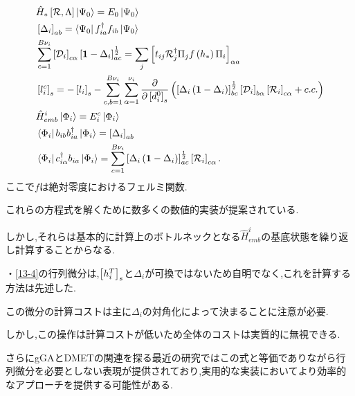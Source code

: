 \begin{align}
    &\hat{H}_{*}\left[ \mathcal{R},\Lambda \right]\Ket{\Psi_{0}}=E_{0}\Ket{\Psi_{0}} \label{13-1}\\
    &\left[ \Delta_{i} \right]_{ab}=\Bra{\Psi_{0}}f^\dagger_{ia}f_{ib}\Ket{\Psi_{0}} \label{13-2}\\
    &\sum_{c=1}^{B\nu_{i}}\left[ \mathcal{D}_{i} \right]_{c\alpha}\left[ \bm{1}-\Delta_{i} \right]^{\frac{1}{2}}_{ac}=\sum_{j}\left[ t_{ij}\mathcal{R}^\dagger_{j}\Pi_{j}f\left( h_{*} \right)\Pi_{i} \right]_{\alpha a}\label{13-3}\\
    &\left[ l^{c}_{i} \right]_{s}=-\left[ l_{i} \right]_{s}-\sum_{c,b=1}^{B\nu_{i}}\sum_{\alpha=1}^{\nu_{i}}\frac{\partial }{\partial \left[ d^{0}_{i} \right]_{s}}\left( \left[ \Delta_{i}\left( \bm{1}-\Delta_{i} \right) \right]^{\frac{1}{2}}_{bc}\left[ \mathcal{D}_{i} \right]_{b\alpha}\left[ \mathcal{R}_{i} \right]_{c\alpha}+c.c. \right) \label{13-4}\\
    &\hat{H}^{i}_{emb}\Ket{\Phi_{i}}=E^{c}_{i}\Ket{\Phi_{i}} \label{13-5}\\
    &\Bra{\Phi_{i}}b_{ib}b^\dagger_{ia}\Ket{\Phi_{i}}=\left[ \Delta_{i} \right]_{ab} \label{13-6}\\
    &\Bra{\Phi_{i}}c^\dagger_{i\alpha}b_{ia}\Ket{\Phi_{i}}=\sum_{c=1}^{B\nu_{i}}\left[ \Delta_{i}\left( \bm{1}-\Delta_{i} \right) \right]^{\frac{1}{2}}_{ac}\left[ \mathcal{R}_{i} \right]_{c\alpha}.\label{13-7}
\end{align}
ここで$f$は絶対零度におけるフェルミ関数.

これらの方程式を解くために数多くの数値的実装が提案されている.

しかし,それらは基本的に計算上のボトルネックとなる$\hat{H}^{i}_{emb}$の基底状態を繰り返し計算することからなる.

・\eqref{13-4}の行列微分は,$\left[ h^{T}_{i} \right]_{s}$と$\Delta_{i}$が可換ではないため自明でなく,これを計算する方法は先述した.

この微分の計算コストは主に$\Delta_{i}$の対角化によって決まることに注意が必要.

しかし,この操作は計算コストが低いため全体のコストは実質的に無視できる.

さらにgGAとDMETの関連を探る最近の研究ではこの式と等価でありながら行列微分を必要としない表現が提供されており,実用的な実装においてより効率的なアプローチを提供する可能性がある.

